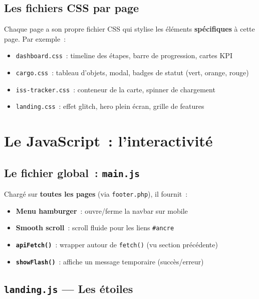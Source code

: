 \documentclass[12pt,a4paper]{article}
\begin{document}
\subsection{Les fichiers CSS par page}

Chaque page a son propre fichier CSS qui stylise les éléments \textbf{spécifiques} à cette page. Par exemple~:
\begin{itemize}
    \item \texttt{dashboard.css}~: timeline des étapes, barre de progression, cartes KPI
    \item \texttt{cargo.css}~: tableau d'objets, modal, badges de statut (vert, orange, rouge)
    \item \texttt{iss-tracker.css}~: conteneur de la carte, spinner de chargement
    \item \texttt{landing.css}~: effet glitch, hero plein écran, grille de features
\end{itemize}

\section{Le JavaScript~: l'interactivité}

\subsection{Le fichier global~: \texttt{main.js}}

Chargé sur \textbf{toutes les pages} (via \texttt{footer.php}), il fournit~:

\begin{itemize}
    \item \textbf{Menu hamburger}~: ouvre/ferme la navbar sur mobile
    \item \textbf{Smooth scroll}~: scroll fluide pour les liens \texttt{\#ancre}
    \item \textbf{\texttt{apiFetch()}}~: wrapper autour de \texttt{fetch()} (vu section précédente)
    \item \textbf{\texttt{showFlash()}}~: affiche un message temporaire (succès/erreur)
\end{itemize}

\subsection{\texttt{landing.js} --- Les étoiles}
\end{document}
